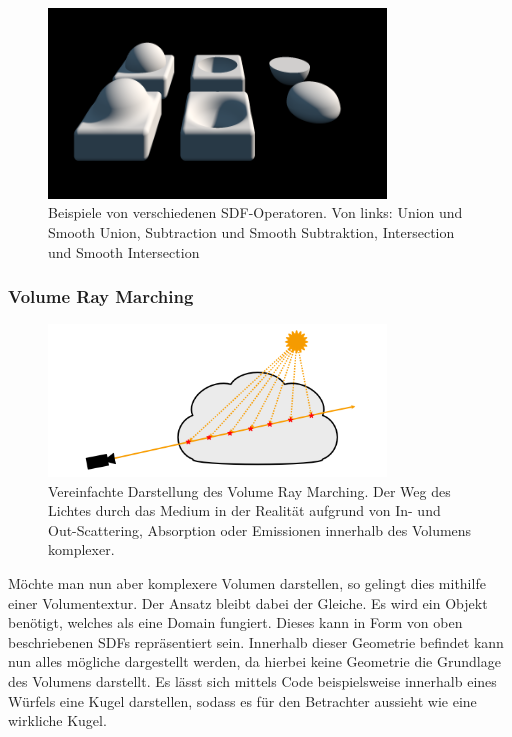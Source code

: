\begin{figure}[h]
	\centering
	\includegraphics[width=0.80\textwidth]{Grafiken/Basics/Volume/sdfOperators.png}
	\begin{footnotesize}
		\caption{Beispiele von verschiedenen SDF-Operatoren.
			Von links: Union und Smooth Union, Subtraction und Smooth Subtraktion, Intersection und Smooth Intersection}
		\label{fig:sdfOperators}
	\end{footnotesize}
\end{figure}




\subsubsection{Volume Ray Marching}

\begin{figure}[h]
	\centering
	\includegraphics[width=0.80\textwidth]{Grafiken/Basics/Volume/Volume_RayMarching.png}
	\begin{footnotesize}
		\caption{Vereinfachte Darstellung des Volume Ray Marching. Der Weg des Lichtes durch
			das Medium in der Realität aufgrund von In- und Out-Scattering, Absorption oder Emissionen innerhalb des
			Volumens komplexer.}
		\label{fig:volumeRayMarching}
	\end{footnotesize}
\end{figure}


Möchte man nun aber komplexere Volumen darstellen, so gelingt dies mithilfe einer Volumentextur. Der Ansatz bleibt dabei der Gleiche.
Es wird ein Objekt benötigt, welches als eine Domain fungiert. Dieses kann in Form von oben beschriebenen SDFs repräsentiert sein.
Innerhalb dieser Geometrie befindet kann nun alles mögliche dargestellt werden, da hierbei keine Geometrie die Grundlage des
Volumens darstellt. Es lässt sich mittels Code beispielsweise innerhalb eines Würfels eine Kugel darstellen,
sodass es für den Betrachter aussieht wie eine wirkliche Kugel.


